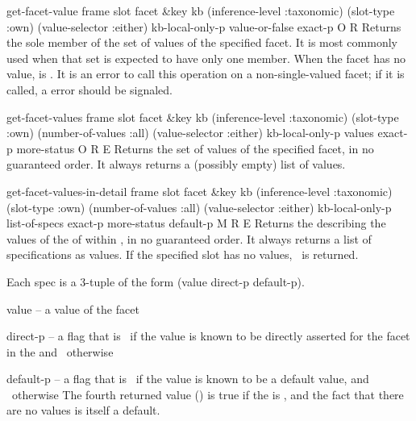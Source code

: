 \begin{okbcop}{get-facet-value}{ frame slot facet \&key kb (inference-level :taxonomic) (slot-type :own) (value-selector :either) kb-local-only-p} { value-or-false exact-p } { O } { R } {  }
Returns the sole member of the set of values
   of the specified facet.  It is most commonly used when that set is 
   expected to have only one member.  When the facet has no value,
    is \false.  It is an error to
   call this operation on a non-single-valued facet; if it is called, a
    error should be signaled.
\end{okbcop}

\begin{okbcop}{get-facet-values}{ frame slot facet \&key kb (inference-level :taxonomic) (slot-type :own) (number-of-values :all) (value-selector :either) kb-local-only-p} { values exact-p more-status } { O } { R } { E }
Returns the set of values of the specified facet,
   in no guaranteed order.  It always returns a (possibly empty) list
   of values.
\end{okbcop}

\begin{okbcop}{get-facet-values-in-detail}{ frame slot facet \&key kb (inference-level :taxonomic) (slot-type :own) (number-of-values :all) (value-selector :either) kb-local-only-p} { list-of-specs exact-p more-status default-p } { M } { R } { E }
Returns the  describing the values
   of the  of  within , in no guaranteed
   order.   It always returns a list of specifications as values.  If the
   specified slot has no values, \emptylist\ is returned.

   Each spec is a 3-tuple of the form (value direct-p default-p).
   \bitem
   \item value -- a value of the facet
   \item direct-p -- a flag that is \true\ if the value is known to be
                      directly asserted for the facet in the  and
                      \false\ otherwise
   \item default-p -- a flag that is \true\ if the value is known to be
                       a default value, and \false\ otherwise
   \eitem
   The fourth returned value () is true if the
    is \emptylist, and the fact that there are no values
   is itself a default.
\end{okbcop}

